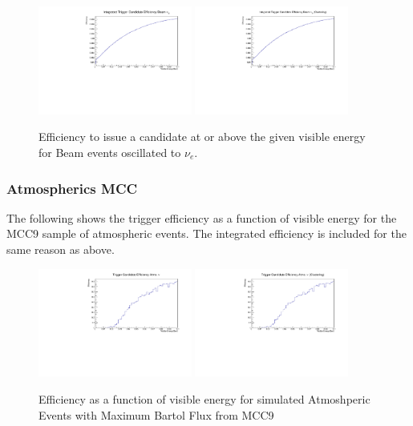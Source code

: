 \documentclass[11pt]{article}
\begin{document}
\begin{figure}[H]
    \centering
    \includegraphics[angle=270,width=0.45\textwidth]{UpdatedEff/Integrated_Nu_e_Efficiency_MCC10.pdf}
    \includegraphics[angle=270,width=0.45\textwidth]{UpdatedEff/Integrated_Nu_e_Efficiency_MCC10_CLUS.pdf}
    \caption{Efficiency to issue a candidate at or above the given visible energy for Beam events oscillated to $\nu_{e}$.}
    \label{fig:eff_beam_nue_int}
\end{figure}

\subsubsection{Atmospherics MCC}

The following shows the trigger efficiency as a function of visible energy for the MCC9 sample of atmospheric events. The integrated efficiency is included for the same reason as above.


\begin{figure}[H]
    \centering
    \includegraphics[angle=270,width=0.45\textwidth]{UpdatedEff/Differential_Atmnu_Max_Efficiency_MCC9.pdf}
    \includegraphics[angle=270,width=0.45\textwidth]{UpdatedEff/Differential_Atmnu_Max_Efficiency_MCC9_CLUS.pdf}
    \caption{Efficiency as a function of visible energy for simulated Atmoshperic Events with Maximum Bartol Flux from MCC9}
    \label{fig:eff_atm}
\end{figure}
\end{document}
